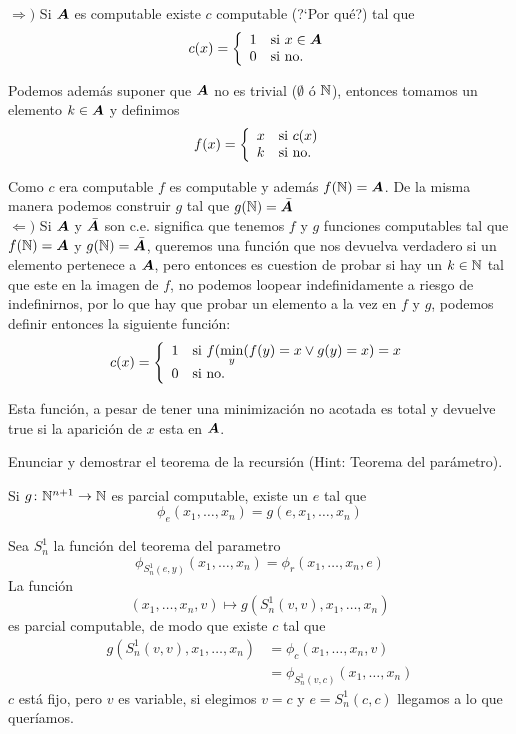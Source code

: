 \documentclass[leqno, 12pt, twoside,letterpaper]{book}
\begin{document}
\begin{solucion}

\begin{dem}
$\Rightarrow)$	Si $\bm{A}$ es computable existe $c$ computable (?`Por qué?) tal que
		\[ c(x) = \left\{ \begin{array}{ll} 1 & \mbox{si } x \in \bm{A} \\ 0 & \mbox{} \mbox{si no.} \end{array} \right. \]

		\noindent Podemos además suponer que $\bm{A}$ no es trivial ($\emptyset$ ó $\mathbb{N}$), entonces tomamos un elemento $k \in \bm{A}$ y definimos
		\[ f(x) = \left\{ \begin{array}{ll} x & \mbox{si } c(x) \\ k & \mbox{} \mbox{si no.} \end{array} \right. \]

	\noindent Como $c$ era computable $f$ es computable y además $f(\mathbb{N}) = \bm{A}$. De la misma manera podemos construir $g$ tal que $g(\mathbb{N}) = \bar{\bm{A}}$\\

	\noindent $\Leftarrow)$ Si $\bm{A}$ y $\bar{\bm{A}}$ son c.e. significa que tenemos $f$ y $g$ funciones computables tal que $f(\mathbb{N}) = \bm{A}$ y $g(\mathbb{N}) = \bar{\bm{A}}$, queremos una función que nos devuelva verdadero si un elemento pertenece a $\bm{A}$, pero entonces es cuestion de probar si hay un $k \in \mathbb{N}$ tal que este en la imagen de $f$, no podemos loopear indefinidamente a riesgo de indefinirnos, por lo que hay que probar un elemento a la vez en $f$ y $g$, podemos definir entonces la siguiente función:
	\[ c(x) = \left\{ \begin{array}{ll} 1 & \mbox{si } f(\min\limits_{y}(f(y) = x \lor g(y) = x) = x \\ 0 & \mbox{} \mbox{si no.} \end{array} \right. \]
\end{dem}

\noindent Esta función, a pesar de tener una minimización no acotada es total y devuelve true si la aparición de $x$ esta en $\bm{A}$.
\end{solucion}
\begin{ej}{2}
    Enunciar y demostrar el teorema de la recursión (Hint: Teorema del parámetro).
\end{ej}

\begin{solucion}
\begin{teo}{}
	Si $g \colon \mathbb{N}^{n + 1} \to \mathbb{N}$ es parcial computable, existe un $e$ tal que
	\[ \phi_e(x_1, \dots, x_n) = g(e, x_1, \dots, x_n)\]
\end{teo}

\begin{dem}
	Sea $S_n^1$ la función del teorema del parametro
	\[ \phi_{S_n^1(e, y)}(x_1, \dots, x_n) = \phi_r(x_1, \dots, x_n, e) \]
La función \[(x_1, \dots, x_n, v) \mapsto g(S_n^1(v, v), x_1, \dots, x_n)\]
es parcial computable, de modo que existe $c$ tal que
\begin{align*}
	g(S_n^1(v, v), x_1, \dots, x_n) &= \phi_c(x_1, \dots, x_n, v)\\
									&= \phi_{S_n^1(v, c)}(x_1, \dots, x_n)
\end{align*}
$c$ está fijo, pero $v$ es variable, si elegimos $v = c$ y $e = S_n^1(c, c)$ llegamos a lo que queríamos.

\end{dem}
\end{solucion}
\end{document}

